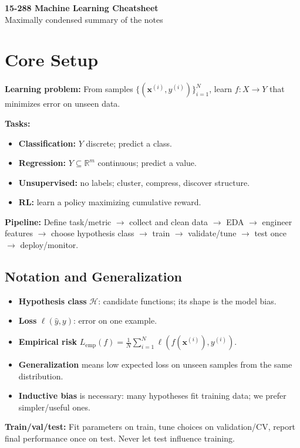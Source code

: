 \documentclass[10pt,twocolumn]{article}
\newcommand{\bbR}{\mathbb{R}}
\newcommand{\x}{\mathbf{x}}
\newcommand{\Hc}{\mathcal{H}}
\newcommand{\chead}[1]{\vspace{0.15em}\textbf{#1:} }
\begin{document}
\thispagestyle{plain}
\begin{center}
{\LARGE\bfseries 15-288 Machine Learning Cheatsheet}\\[-0.15em]
{\small Maximally condensed summary of the notes}
\end{center}
\vspace{-0.8em}

\section{Core Setup}
\chead{Learning problem} From samples $\{(\x^{(i)},y^{(i)})\}_{i=1}^N$, learn $f:X\to Y$ that minimizes error on unseen data.\

\chead{Tasks}
\begin{itemize}
  \item \textbf{Classification:} $Y$ discrete; predict a class.
  \item \textbf{Regression:} $Y\subseteq\bbR^m$ continuous; predict a value.
  \item \textbf{Unsupervised:} no labels; cluster, compress, discover structure.
  \item \textbf{RL:} learn a policy maximizing cumulative reward.
\end{itemize}
\chead{Pipeline} Define task/metric $\to$ collect and clean data $\to$ EDA $\to$ engineer features $\to$ choose hypothesis class $\to$ train $\to$ validate/tune $\to$ test once $\to$ deploy/monitor.

\subsection{Notation and Generalization}
\begin{itemize}
  \item \textbf{Hypothesis class} $\Hc$: candidate functions; its shape is the model bias.
  \item \textbf{Loss} $\ell(\hat y,y)$: error on one example.
  \item \textbf{Empirical risk} $L_{\mathrm{emp}}(f)=\frac{1}{N}\sum_{i=1}^N \ell(f(\x^{(i)}),y^{(i)})$.
  \item \textbf{Generalization} means low expected loss on unseen samples from the same distribution.
  \item \textbf{Inductive bias} is necessary: many hypotheses fit training data; we prefer simpler/useful ones.
\end{itemize}
\chead{Train/val/test} Fit parameters on train, tune choices on validation/CV, report final performance once on test. Never let test influence training.
\end{document}
